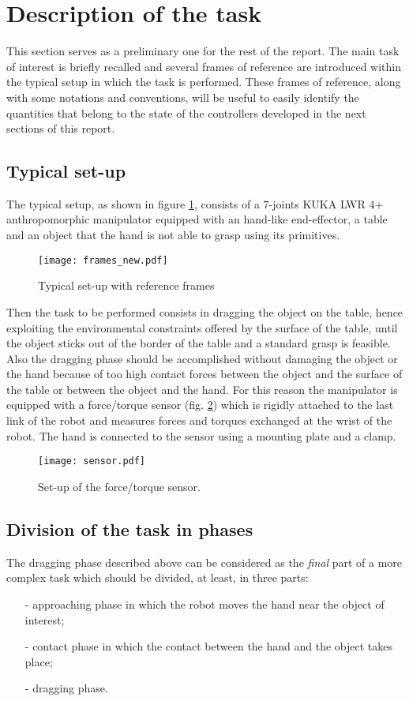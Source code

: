 \section{Description of the task}\label{sec:task_description}
This section serves as a preliminary one for the rest of the report. The main task
of interest is briefly recalled and several frames of reference are introduced within
the typical setup in which the task is performed. These frames of reference, along
with some notations and conventions, will be useful to easily identify the quantities
that belong to the state of the controllers developed in the next sections of this report.

\subsection{Typical set-up}
The typical setup, as shown in figure \ref{fig:frames}, consists of a $7$-joints KUKA LWR $4$+
anthropomorphic manipulator equipped with an hand-like end-effector, a table and an object that the hand is not
able to grasp using its primitives.
\begin{figure}[h]
  \centering
  \texttt{[image: frames\_new.pdf]}
  \caption{Typical set-up with reference frames \label{fig:frames}}
\end{figure}
Then the task to be performed consists in dragging the object on the table, hence exploiting
the environmental constraints offered by the surface of the table, until the object sticks
out of the border of the table and a standard grasp is feasible. Also the dragging phase should
be accomplished without damaging the object or the hand because of too high contact forces between
the object and the surface of the table or between the object and the hand.
For this reason the manipulator is equipped with a force/torque sensor (fig. \ref{fig:sensor}) which is rigidly attached
to the last link of the robot and measures forces and torques exchanged at the wrist of the robot.
The hand is connected to the sensor using a mounting plate and a clamp.
\begin{figure}[h]
  \centering
  \texttt{[image: sensor.pdf]}
  \caption{Set-up of the force/torque sensor.\label{fig:sensor}}
\end{figure}

\subsection{Division of the task in phases}\label{sec:task_division}
The dragging phase described above can be considered as the \emph{final} part of a more
complex task which should be divided, at least, in three parts:
\begin{itemize}
\item[-] approaching phase in which the robot moves the hand near the object of interest;
\item[-] contact phase in which the contact between the hand and the object takes place;
\item[-] dragging phase.
\end{itemize}

